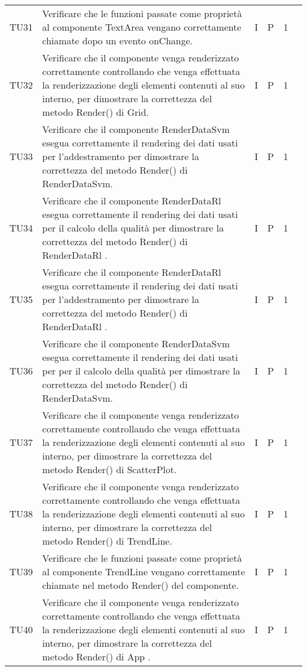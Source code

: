 \begin{longtable} {
		>{}p{12mm}
		>{}p{79.5mm}
		>{}p{9mm}
		>{}p{8mm}
		>{}p{14mm}
		>{}p{0mm}}
	TU31		& Verificare che le funzioni passate come proprietà al componente TextArea vengano correttamente chiamate dopo un evento onChange. & I & P & 1 & \TBstrut \\ [2mm]
	TU32		& Verificare che il componente venga renderizzato correttamente controllando che venga effettuata la renderizzazione degli elementi contenuti al suo interno, per dimostrare la correttezza del metodo Render() di Grid. & I & P & 1 & \TBstrut \\ [2mm]
	TU33		& Verificare che il componente RenderDataSvm esegua correttamente il rendering dei dati usati per l'addestramento per dimostrare la correttezza del metodo Render() di RenderDataSvm. & I & P & 1 & \TBstrut \\ [2mm]
	TU34		& Verificare che il componente RenderDataRl esegua correttamente il rendering dei dati usati per il calcolo della qualità per dimostrare la correttezza del metodo Render() di RenderDataRl . & I & P & 1 & \TBstrut \\ [2mm]
	TU35		& Verificare che il componente RenderDataRl esegua correttamente il rendering dei dati usati per l'addestramento per dimostrare la correttezza del metodo Render() di RenderDataRl . & I & P & 1 & \TBstrut \\ [2mm]
	TU36		& Verificare che il componente RenderDataSvm esegua correttamente il rendering dei dati usati per per il calcolo della qualità per dimostrare la correttezza del metodo Render() di RenderDataSvm. & I & P & 1 & \TBstrut \\ [2mm]
	TU37		& Verificare che il componente venga renderizzato correttamente controllando che venga effettuata la renderizzazione degli elementi contenuti al suo interno, per dimostrare la correttezza del metodo Render() di ScatterPlot. & I & P & 1 & \TBstrut \\ [2mm]
	TU38		& Verificare che il componente venga renderizzato correttamente controllando che venga effettuata la renderizzazione degli elementi contenuti al suo interno, per dimostrare la correttezza del metodo Render() di TrendLine. & I & P & 1 & \TBstrut \\ [2mm]
	TU39		& Verificare che le funzioni passate come proprietà al componente TrendLine vengano correttamente chiamate nel metodo Render() del componente. & I & P & 1 & \TBstrut \\ [2mm]
	TU40		& Verificare che il componente venga renderizzato correttamente controllando che venga effettuata la renderizzazione degli elementi contenuti al suo interno, per dimostrare la correttezza del metodo Render() di App . & I & P & 1 & \TBstrut \\ [2mm]


\end{longtable}
